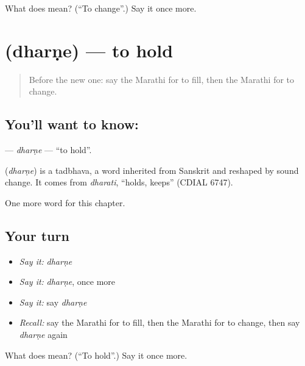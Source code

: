 \begin{tcolorbox}[breakable,colback=teal!4,colframe=teal!35!black,title={Before you move on}]
What does  mean? (\textquotedblleft{}To change\textquotedblright{}.) Say it once more.
\end{tcolorbox}
\section[\texorpdfstring{\mr{धरणे} (dharṇe)}{धरणे (dharṇe)}]{ (dharṇe) — to hold}

\label{lesson:MR-C84-dharne}



\begin{quote}
Before the new one: say the Marathi for to fill, then the Marathi for to change.
\end{quote}

\subsection*{You'll want to know: }
\textbf{} — \emph{dharṇe} — \textquotedblleft{}to hold\textquotedblright{}.

\begin{cousinweb}
\textbf{} (\emph{dharṇe}) is a tadbhava, a word inherited from Sanskrit and reshaped by sound change. It comes from \emph{dharati}, \textquotedblleft{}holds, keeps\textquotedblright{} (CDIAL 6747).
\end{cousinweb}

\begin{grammarlens}[title={What you've built}]
One more word for this chapter.
\end{grammarlens}

\subsection*{Your turn}
\begin{itemize}
\raggedright
  \item \emph{Say it:} \emph{dharṇe}
  \item \emph{Say it:} \emph{dharṇe}, once more
  \item \emph{Say it:} say \emph{dharṇe}
  \item \emph{Recall:} say the Marathi for to fill, then the Marathi for to change, then say \emph{dharṇe} again
\end{itemize}

\begin{tcolorbox}[breakable,colback=teal!4,colframe=teal!35!black,title={Before you move on}]
What does  mean? (\textquotedblleft{}To hold\textquotedblright{}.) Say it once more.
\end{tcolorbox}
